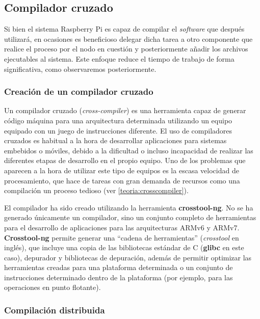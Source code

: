 \subsection{Compilador cruzado}

Si bien el sistema Raspberry Pi es capaz de compilar el \textit{software} que después utilizará, en ocasiones es beneficioso delegar dicha tarea a otro componente que realice el proceso por el nodo en cuestión y posteriormente añadir los archivos ejecutables al sistema. Este enfoque reduce el tiempo de trabajo de forma significativa, como observaremos posteriormente.%

\subsubsection{Creación de un compilador cruzado}

Un compilador cruzado (\textit{cross-compiler}) es una herramienta capaz de generar código máquina para una arquitectura determinada utilizando un equipo equipado con un juego de instrucciones diferente. %
El uso de compiladores cruzados es habitual a la hora de desarrollar aplicaciones para sistemas embebidos o móviles, debido a la dificultad o incluso incapacidad de realizar las diferentes etapas de desarrollo en el propio equipo. Uno de los problemas que aparecen a la hora de utilizar este tipo de equipos es la escasa velocidad de procesamiento, que hace de tareas con gran demanda de recursos como una compilación un proceso tedioso (ver \ref{teoria:crosscompiler}).

El compilador ha sido creado utilizando la herramienta \textbf{crosstool-ng}. No se ha generado únicamente un compilador, sino un conjunto completo de herramientas para el desarrollo de aplicaciones para las arquitecturas ARMv6 y ARMv7. \textbf{Crosstool-ng} permite generar una ``cadena de herramientas'' (\textit{crosstool} en inglés), que incluye una copia de las bibliotecas estándar de C (\textbf{glibc} en este caso), depurador y bibliotecas de depuración, además de permitir optimizar las herramientas creadas para una plataforma determinada o un conjunto de instrucciones determinado dentro de la plataforma (por ejemplo, para las operaciones en punto flotante).

\subsubsection{Compilación distribuida}

